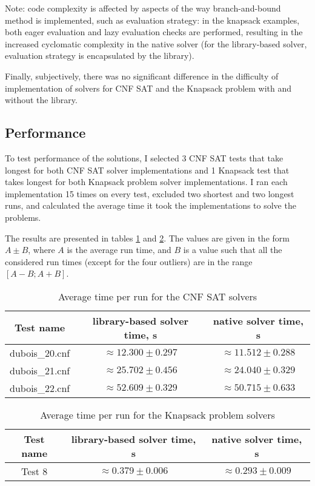 Note: code complexity is affected by aspects of the way branch-and-bound method
is implemented, such as evaluation strategy: in the knapsack examples, both eager evaluation
and lazy evaluation checks are performed, resulting in the increased cyclomatic complexity
in the native solver (for the library-based solver, evaluation strategy is encapsulated
by the library).

Finally, subjectively, there was no significant difference in the difficulty of
implementation of solvers for CNF SAT and the Knapsack problem with and without the library.

\subsection{Performance}

To test performance of the solutions, I selected 3 CNF SAT tests that take longest for
both CNF SAT solver implementations and 1 Knapsack test that takes longest for both
Knapsack problem solver implementations.
I ran each implementation 15 times on every test, excluded two shortest and two longest
runs, and calculated the average time it took the implementations to solve the problems.

The results are presented in tables \ref{tab:perf_cnfsat} and \ref{tab:perf_knapsack}.
The values are given in the form $A\pm B$, where $A$ is the average run time,
and $B$ is a value such that all the considered run times (except for the four outliers) are in
the range $[A - B; A + B]$.

\begin{table}[h]
 \centering
 \caption{Average time per run for the CNF SAT solvers}
 \label{tab:perf_cnfsat}

 \begin{tabular}{|ccc|}
  \hline
  Test name & library-based solver time, s & native solver time, s \\
  \hline
  dubois\_20.cnf & $\approx 12.300\pm 0.297$ & $\approx 11.512\pm 0.288$ \\
  dubois\_21.cnf & $\approx 25.702\pm 0.456$ & $\approx 24.040\pm 0.329$ \\
  dubois\_22.cnf & $\approx 52.609\pm 0.329$ & $\approx 50.715\pm 0.633$ \\
  \hline
 \end{tabular}
\end{table}

\begin{table}[h]
 \centering
 \caption{Average time per run for the Knapsack problem solvers}
 \label{tab:perf_knapsack}

 \begin{tabular}{|ccc|}
  \hline
  Test name & library-based solver time, s & native solver time, s \\
  \hline
  Test 8 & $\approx 0.379\pm 0.006$ & $\approx 0.293\pm 0.009$ \\
  \hline
 \end{tabular}
\end{table}

